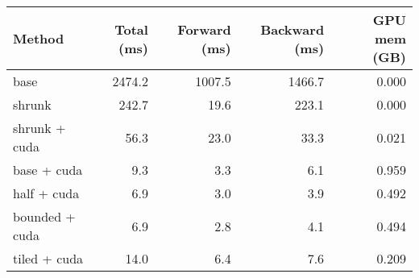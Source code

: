 \begin{tabular}{lrrrr}
\hline
 Method         &   Total (ms) &   Forward (ms) &   Backward (ms) &   GPU mem (GB) \\
\hline
 base           &       2474.2 &         1007.5 &          1466.7 &          0.000 \\
 shrunk         &        242.7 &           19.6 &           223.1 &          0.000 \\
 shrunk + cuda  &         56.3 &           23.0 &            33.3 &          0.021 \\
 base + cuda    &          9.3 &            3.3 &             6.1 &          0.959 \\
 half + cuda    &          6.9 &            3.0 &             3.9 &          0.492 \\
 bounded + cuda &          6.9 &            2.8 &             4.1 &          0.494 \\
 tiled + cuda   &         14.0 &            6.4 &             7.6 &          0.209 \\
\hline
\end{tabular}
